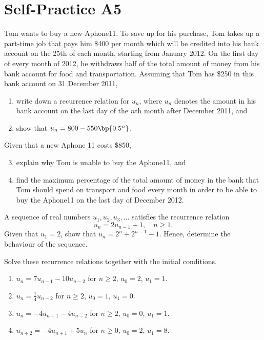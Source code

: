 \section{Self-Practice A5}

\begin{problem}
    Tom wants to buy a new Aphone11. To save up for his purchase, Tom takes up a part-time job that pays him \$400 per month which will be credited into his bank account on the 25th of each month, starting from January 2012. On the first day of every month of 2012, he withdraws half of the total amount of money from his bank account for food and transportation. Assuming that Tom has \$250 in this bank account on 31 December 2011,
    \begin{enumerate}
        \item write down a recurrence relation for $u_n$, where $u_n$ denotes the amount in his bank account on the last day of the $n$th month after December 2011, and
        \item show that $u_n = 800 - 550\bp{0.5^n}$.
    \end{enumerate}
    Given that a new Aphone 11 costs \$850,
    \begin{enumerate}
        \setcounter{enumi}{2}
        \item explain why Tom is unable to buy the Aphone11, and
        \item find the maximum percentage of the total amount of money in the bank that Tom should spend on transport and food every month in order to be able to buy the Aphone11 on the last day of December 2012.
    \end{enumerate}
\end{problem}

\begin{problem}
    A sequence of real numbers $u_1, u_2, u_3, \dots$ satisfies the recurrence relation \[u_n = 2u_{n-1} + 1, \quad n \geq 1.\] Given that $u_1 = 2$, show that $u_n = 2^n + 2^{n-1} - 1$. Hence, determine the behaviour of the sequence.
\end{problem}

\begin{problem}
    Solve these recurrence relations together with the initial conditions.

    \begin{enumerate}
        \item $u_n = 7u_{n-1} - 10u_{n-2}$ for $n \geq 2$, $u_0 = 2$, $u_1 = 1$.
        \item $u_n = \frac14 u_{n-2}$ for $n \geq 2$, $u_0 = 1$, $u_1 = 0$.
        \item $u_n = -4u_{n-1} - 4u_{n-2}$ for $n \geq 2$, $u_0 = 0$, $u_1 = 1$.
        \item $u_{n+2} = -4u_{n+1} + 5u_n$ for $n \geq 0$, $u_0 = 2$, $u_1 = 8$.
    \end{enumerate}
\end{problem}

